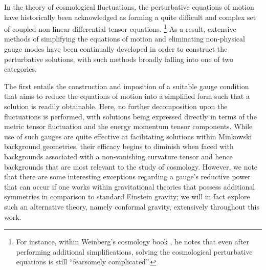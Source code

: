 In the theory of cosmological fluctuations, the perturbative equations of motion have historically been acknowledged as forming a quite difficult and complex set of coupled non-linear differential tensor equations. 
\renewcommand{\baselinestretch}{1}
\footnote{For instance, within Weinberg's cosmology book \cite{weinberg_2008}, he notes that even after performing additional simplifications, solving the cosmological perturbative equations is still ``fearsomely complicated''.}
As a result, extensive methods of simplifying the equations of motion and eliminating non-physical gauge modes have been continually developed in order to construct the perturbative solutions, with such methods broadly falling into one of two categories. 

The first entails the construction and imposition of a suitable gauge condition that aims to reduce the equations of motion into a simplified form such that a solution is readily obtainable. Here, no further decomposition upon the fluctuations is performed, with solutions being expressed directly in terms of the metric tensor fluctuation and the energy momentum tensor components. While use of such gauges are quite effective at facilitating solutions within Minkowski background geometries, their efficacy begins to diminish when faced with backgrounds associated with a non-vanishing curvature tensor and hence backgrounds that are most relevant to the study of cosmology. However, we note that there are some interesting exceptions regarding a gauge's reductive power that can occur if one works within gravitational theories that possess additional symmetries in comparison to standard Einstein gravity; we will in fact explore such an alternative theory, namely conformal gravity, extensively throughout this work. 

